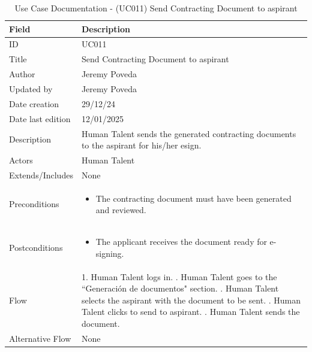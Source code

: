 \documentclass{scrreprt}
\begin{document}
\begin{table}[H]
	\centering
	\begin{tabular}{|p{3cm}|p{10cm}|}
		\hline
		\textbf{Field} & \textbf{Description} \\ \hline
		ID & UC011 \\ \hline
		Title & Send Contracting Document to aspirant\\ \hline
		Author & Jeremy Poveda\\ \hline
		Updated by &  Jeremy Poveda \\ \hline
		Date creation & 29/12/24 \\ \hline
		Date last edition & 12/01/2025 \\ \hline
		Description & 
		Human Talent sends the generated contracting documents to the aspirant for his/her esign. \\ \hline
		Actors & Human Talent \\ \hline
		Extends/Includes & None \\ \hline
		Preconditions & 
		\begin{itemize}
			\item The contracting document must have been generated and reviewed.
		\end{itemize} \\ \hline
		Postconditions & 
		\begin{itemize}
			\item The applicant receives the document ready for e-signing.
		\end{itemize} \\ \hline
		Flow & 
		1. Human Talent logs in. \newline
		2. Human Talent goes to the “Generación de documentos" section. \newline
		3. Human Talent selects the aspirant with the document to be sent. \newline
		4. Human Talent clicks to send to aspirant. \newline
		5. Human Talent sends the document. \\ \hline
		Alternative Flow & 
		None\\ \hline
	\end{tabular}
	\caption{Use Case Documentation - (UC011) Send Contracting Document to aspirant}
	\label{table:UC011}
\end{table}
\end{document}
